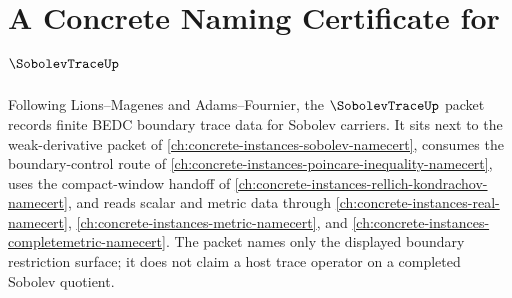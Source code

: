 \chapter{A Concrete Naming Certificate for $\SobolevTraceUp$}
\label{ch:concrete-instances-sobolev-trace-namecert}

Following Lions--Magenes and Adams--Fournier, the $\SobolevTraceUp$ packet records finite BEDC boundary trace data for Sobolev carriers. It sits next to the weak-derivative packet of \autoref{ch:concrete-instances-sobolev-namecert}, consumes the boundary-control route of \autoref{ch:concrete-instances-poincare-inequality-namecert}, uses the compact-window handoff of \autoref{ch:concrete-instances-rellich-kondrachov-namecert}, and reads scalar and metric data through \autoref{ch:concrete-instances-real-namecert}, \autoref{ch:concrete-instances-metric-namecert}, and \autoref{ch:concrete-instances-completemetric-namecert}. The packet names only the displayed boundary restriction surface; it does not claim a host trace operator on a completed Sobolev quotient.

